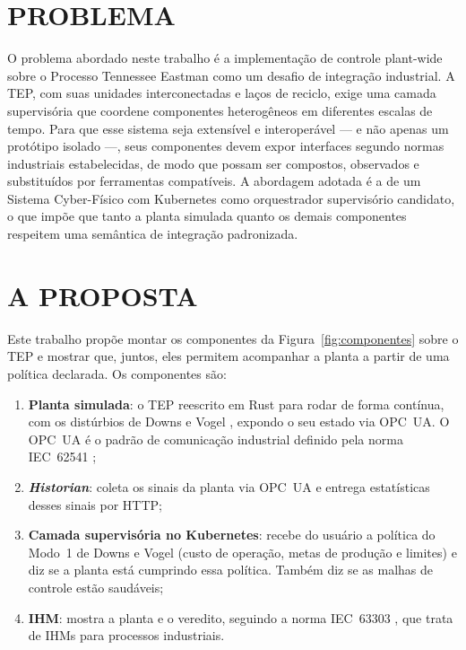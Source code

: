 \section{PROBLEMA}
\label{sec:problema}

O problema abordado neste trabalho é a implementação de controle plant-wide sobre o Processo Tennessee Eastman como um desafio de integração industrial. A TEP, com suas unidades interconectadas e laços de reciclo, exige uma camada supervisória que coordene componentes heterogêneos em diferentes escalas de tempo. Para que esse sistema seja extensível e interoperável — e não apenas um protótipo isolado —, seus componentes devem expor interfaces segundo normas industriais estabelecidas, de modo que possam ser compostos, observados e substituídos por ferramentas compatíveis. A abordagem adotada é a de um Sistema Cyber-Físico com Kubernetes como orquestrador supervisório candidato, o que impõe que tanto a planta simulada quanto os demais componentes respeitem uma semântica de integração padronizada.

\section{A PROPOSTA}
\label{sec:proposta}

Este trabalho propõe montar os componentes da Figura~\ref{fig:componentes} sobre o TEP e mostrar que, juntos, eles permitem acompanhar a planta a partir de uma política declarada. Os componentes são:

\begin{enumerate}
  \item \textbf{Planta simulada}: o TEP reescrito em Rust para rodar de forma contínua, com os distúrbios de Downs e Vogel \cite{DOWNS1993}, expondo o seu estado via OPC~UA. O OPC~UA é o padrão de comunicação industrial definido pela norma IEC~62541 \cite{IEC62541_1};
  \item \textbf{\textit{Historian}}: coleta os sinais da planta via OPC~UA e entrega estatísticas desses sinais por HTTP;
  \item \textbf{Camada supervisória no Kubernetes}: recebe do usuário a política do Modo~1 de Downs e Vogel (custo de operação, metas de produção e limites) e diz se a planta está cumprindo essa política. Também diz se as malhas de controle estão saudáveis;
  \item \textbf{IHM}: mostra a planta e o veredito, seguindo a norma IEC~63303 \cite{IEC63303}, que trata de IHMs para processos industriais.
\end{enumerate}

